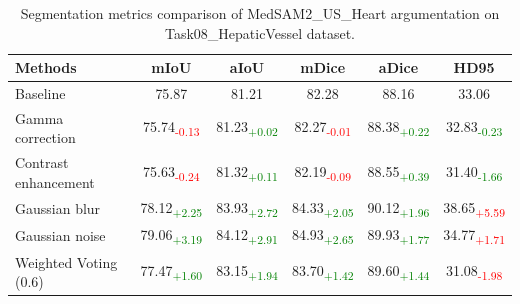 \documentclass{article}
\newcommand{\hepGammaMIoU}{-0.13}
\newcommand{\hepGammaAIoU}{+0.02}
\newcommand{\hepGammaMDice}{-0.01}
\newcommand{\hepGammaADice}{+0.22}
\newcommand{\hepGammaHD}{-0.23}
\newcommand{\hepContrastMIoU}{-0.24}
\newcommand{\hepContrastAIoU}{+0.11}
\newcommand{\hepContrastMDice}{-0.09}
\newcommand{\hepContrastADice}{+0.39}
\newcommand{\hepContrastHD}{-1.66}
\newcommand{\hepBlurMIoU}{+2.25}
\newcommand{\hepBlurAIoU}{+2.72}
\newcommand{\hepBlurMDice}{+2.05}
\newcommand{\hepBlurADice}{+1.96}
\newcommand{\hepBlurHD}{+5.59}
\newcommand{\hepNoiseMIoU}{+3.19}
\newcommand{\hepNoiseAIoU}{+2.91}
\newcommand{\hepNoiseMDice}{+2.65}
\newcommand{\hepNoiseADice}{+1.77}
\newcommand{\hepNoiseHD}{+1.71}
\newcommand{\hepVoteMIoU}{+1.60}
\newcommand{\hepVoteAIoU}{+1.94}
\newcommand{\hepVoteMDice}{+1.42}
\newcommand{\hepVoteADice}{+1.44}
\newcommand{\hepVoteHD}{-1.98}
\begin{document}
\begin{table}[t]
\centering
\caption{Segmentation metrics comparison of MedSAM2\_US\_Heart argumentation on Task08\_HepaticVessel dataset.}
\begin{tabular}{lccccc}
\toprule
        \textbf{Methods} & \textbf{mIoU} & \textbf{aIoU} & \textbf{mDice} & \textbf{aDice} & \textbf{HD95} \\ \midrule
        Baseline & 75.87 & 81.21 & 82.28 & 88.16 & 33.06 \\
        Gamma correction    & 75.74\textsubscript{\textcolor{red}{\hepGammaMIoU}} 
                            & 81.23\textsubscript{\textcolor{green}{\hepGammaAIoU}}
                            & 82.27\textsubscript{\textcolor{red}{\hepGammaMDice}}
                            & 88.38\textsubscript{\textcolor{green}{\hepGammaADice}}
                            & 32.83\textsubscript{\textcolor{green}{\hepGammaHD}} \\
        Contrast enhancement & 75.63\textsubscript{\textcolor{red}{\hepContrastMIoU}} 
                            & 81.32\textsubscript{\textcolor{green}{\hepContrastAIoU}}
                            & 82.19\textsubscript{\textcolor{red}{\hepContrastMDice}}
                            & 88.55\textsubscript{\textcolor{green}{\hepContrastADice}}
                            & 31.40\textsubscript{\textcolor{green}{\hepContrastHD}} \\
        Gaussian blur     & 78.12\textsubscript{\textcolor{green}{\hepBlurMIoU}} 
                          & 83.93\textsubscript{\textcolor{green}{\hepBlurAIoU}}
                          & 84.33\textsubscript{\textcolor{green}{\hepBlurMDice}}
                          & 90.12\textsubscript{\textcolor{green}{\hepBlurADice}}
                          & 38.65\textsubscript{\textcolor{red}{\hepBlurHD}}  \\
        Gaussian noise    & 79.06\textsubscript{\textcolor{green}{\hepNoiseMIoU}}
                          & 84.12\textsubscript{\textcolor{green}{\hepNoiseAIoU}}
                          & 84.93\textsubscript{\textcolor{green}{\hepNoiseMDice}} 
                          & 89.93\textsubscript{\textcolor{green}{\hepNoiseADice}} 
                          & 34.77\textsubscript{\textcolor{red}{\hepNoiseHD}}  \\
        \midrule
        Weighted Voting (0.6)    
                          & 77.47\textsubscript{\textcolor{green}{\hepVoteMIoU}}
                          & 83.15\textsubscript{\textcolor{green}{\hepVoteAIoU}}
                          & 83.70\textsubscript{\textcolor{green}{\hepVoteMDice}} 
                          & 89.60\textsubscript{\textcolor{green}{\hepVoteADice}} 
                          & 31.08\textsubscript{\textcolor{red}{\hepVoteHD}}  \\
\bottomrule
\end{tabular}
\end{table}
\end{document}
